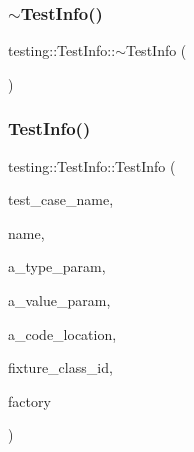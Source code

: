 \mbox{\label{classtesting_1_1_test_info_a8d382c1b1b511f0d9112c14684809852}} 
\subsubsection{\texorpdfstring{$\sim$TestInfo()}{~TestInfo()}\hspace{0.1cm}{\footnotesize\ttfamily [3/3]}}
{\footnotesize\ttfamily testing\+::\+Test\+Info\+::$\sim$\+Test\+Info (\begin{DoxyParamCaption}{ }\end{DoxyParamCaption})}

\mbox{\label{classtesting_1_1_test_info_afc4a66e2d2491f09e8549c71514c3d78}} 
\subsubsection{\texorpdfstring{TestInfo()}{TestInfo()}\hspace{0.1cm}{\footnotesize\ttfamily [3/3]}}
{\footnotesize\ttfamily testing\+::\+Test\+Info\+::\+Test\+Info (\begin{DoxyParamCaption}\item[{const std\+::string \&}]{test\+\_\+case\+\_\+name,  }\item[{const std\+::string \&}]{name,  }\item[{const char $\ast$}]{a\+\_\+type\+\_\+param,  }\item[{const char $\ast$}]{a\+\_\+value\+\_\+param,  }\item[{\mbox{\hyperlink{structtesting_1_1internal_1_1_code_location}{internal\+::\+Code\+Location}}}]{a\+\_\+code\+\_\+location,  }\item[{\mbox{\hyperlink{namespacetesting_1_1internal_a38c435cbab5f8b784e2e7f3356cab242}{internal\+::\+Type\+Id}}}]{fixture\+\_\+class\+\_\+id,  }\item[{\mbox{\hyperlink{classtesting_1_1internal_1_1_test_factory_base}{internal\+::\+Test\+Factory\+Base}} $\ast$}]{factory }\end{DoxyParamCaption})\hspace{0.3cm}{\ttfamily [private]}}



